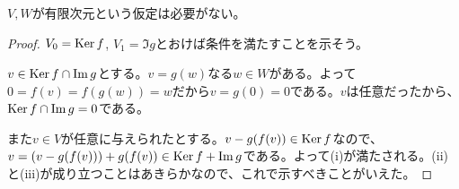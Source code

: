 \subsubsection{}%
\begin{rem}
  $V,W$が有限次元という仮定は必要がない。
\end{rem}
\begin{proof}
  $V_0 = \operatorname{Ker} f$, $V_1 = \Im g$とおけば条件を満たすことを示そう。

  $v \in \operatorname{Ker} f \cap \operatorname{Im} g$とする。$v = g(w)$なる$w \in W$がある。よって$0 = f(v) = f(g(w)) = w$だから$v = g(0) = 0$である。$v$は任意だったから、$\operatorname{Ker} f \cap \operatorname{Im} g = 0$である。

  また$v \in V$が任意に与えられたとする。$v - g(f(v)) \in \operatorname{Ker} f$なので、$v = (v - g(f(v))) + g(f(v)) \in \operatorname{Ker} f + \operatorname{Im} g$である。よって(i)が満たされる。(ii)と(iii)が成り立つことはあきらかなので、これで示すべきことがいえた。
\end{proof}

\newpage


